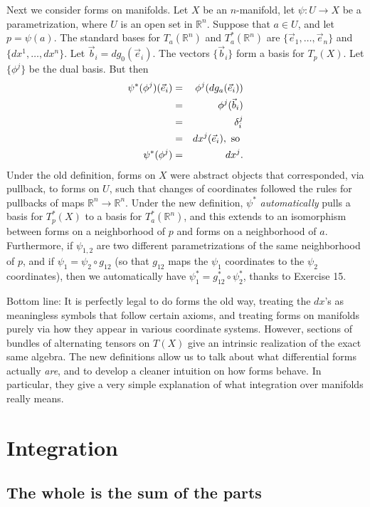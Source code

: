 \documentclass[12pt]{amsbook}
\newcommand{\R}{{\mathbb R}}
\theoremstyle{definition}
\begin{document}
Next we consider forms on manifolds. Let $X$ be an $n$-manifold, let 
$\psi: U \to X$ be a parametrization, where $U$ is an open set in $\R^n$.
Suppose that $a \in U$, and let $p=\psi(a)$. 
The standard bases for $T_a(\R^n)$ and $T_a^*(\R^n)$ are $\{\vec e_1,
\ldots, \vec e_n\}$ and $\{dx^1,\ldots,dx^n\}$. 
Let $\vec b_i = dg_0(\vec e_i)$. The vectors $\{ \vec b_i\}$ form a basis
for $T_p(X)$. Let $\{ \phi^j\}$ be the dual basis. But then
\begin{eqnarray} \psi^*(\phi^j) (\vec e_i) & = & \phi^j (dg_a(\vec e_i))\cr
& = & \phi^j (\vec b_i) \cr 
& = & \delta^j_i \cr 
& = & dx^j(\vec e_i), \hbox{ so } \cr 
\psi^*(\phi^j) & = & dx^j.
\end{eqnarray}
Under the old definition, forms on $X$ were abstract objects that corresponded,
via pullback, to forms on $U$, such that changes of coordinates followed
the rules for pullbacks of maps $\R^n \to \R^n$. 
Under the new definition, $\psi^*$ {\em 
automatically} pulls a basis for $T_p^*(X)$ to a basis for $T_a^*(\R^n)$, 
and this extends to an isomorphism between forms on a neighborhood of $p$
and forms on a neighborhood of $a$. Furthermore, if $\psi_{1,2}$ are two
different parametrizations of the same neighborhood of $p$, and if 
$\psi_1 = \psi_2 \circ g_{12}$ (so that $g_{12}$ maps the $\psi_1$ coordinates
to the $\psi_2$ coordinates), then we automatically have $\psi_1^* = 
g_{12}^* \circ \psi_2^*$, thanks to Exercise 15.

Bottom line: It is perfectly legal to do forms the old way, treating
the $dx$'s as meaningless symbols that follow certain axioms, and treating
forms on manifolds purely via how they appear in various coordinate 
systems. However, sections of bundles of alternating tensors on $T(X)$ give
an intrinsic realization of the exact same algebra. 
The new definitions allow us to talk about what differential forms actually
{\em are}, and to develop a cleaner intuition on how forms behave. 
In particular, they give a very simple explanation of what integration over
manifolds really means. 

\chapter{Integration}


\section{The whole is the sum of the parts}
\end{document}
